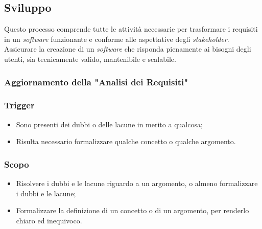 \subsection{Sviluppo}
\label{sviluppo}
Questo processo comprende tutte le attività necessarie per trasformare i requisiti in un \textit{software} funzionante e conforme alle aspettative degli \textit{stakeholder}. \\
Assicurare la creazione di un \textit{software} che risponda pienamente ai bisogni degli utenti, sia tecnicamente valido, mantenibile e scalabile.


\subsubsection{Aggiornamento della "Analisi dei Requisiti"}
\label{aggiornare-adr}
\subsubsection*{Trigger}
\begin{itemize}
	\item Sono presenti dei dubbi o delle lacune in merito a qualcosa;
	\item Risulta necessario formalizzare qualche concetto o qualche argomento.
\end{itemize}

\subsubsection*{Scopo}
\begin{itemize}
	\item Risolvere i dubbi e le lacune riguardo a un argomento, o almeno formalizzare i dubbi e le lacune;
	\item Formalizzare la definizione di un concetto o di un argomento, per renderlo chiaro ed inequivoco.
\end{itemize}

